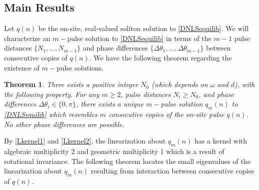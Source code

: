 \documentclass[12pt]{elsarticle}
\newtheorem{theorem}{Theorem}
\begin{document}
\subsection{Main Results}

Let $q(n)$ be the on-site, real-valued soliton solution to \eqref{DNLSequilib}. We will characterize an $m-$pulse solution to \eqref{DNLSequilib} in terms of the $m-1$ pulse distances $\{ N_1, \dots, N_{m-1} \}$ and phase differences $\{ \Delta\theta_1, \dots, \Delta\theta_{m-1} \}$ between consecutive copies of $q(n)$. We have the following theorem regarding the existence of $m-$pulse solutions.

\begin{theorem}\label{DNLSexisttheorem}
There exists a positive integer $N_0$ (which depends on $\omega$ and $d$), with the following property. For any $m \geq 2$, pulse distances $N_i \geq N_0$, and phase differences $\Delta\theta_i \in \{0, \pi\}$, there exists a unique $m-$pulse solution $q_m(n)$ to \eqref{DNLSequilib} which resembles $m$ consecutive copies of the on-site pulse $q(n)$. No other phase differences are possible.
\end{theorem}

By \eqref{Lkernel1} and \eqref{Lkernel2}, the linearization about $q_m(n)$ has a kernel with algebraic multiplicity 2 and geometric multiplicity 1 which is a result of rotational invariance. The following theorem locates the small eigenvalues of the linearization about $q_m(n)$ resulting from interaction between consecutive copies of $q(n)$. 
\end{document}
